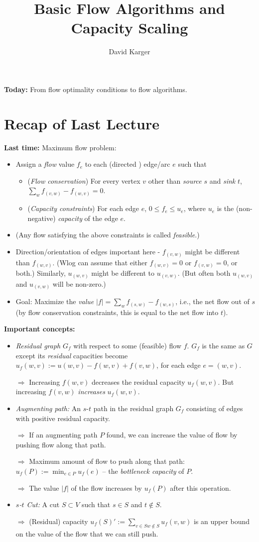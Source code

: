 \documentclass{article}
\title{Basic Flow Algorithms and Capacity Scaling}
\author{David Karger}
\begin{document}
{\bf Today:} From flow optimality conditions to flow algorithms. 

\section{Recap of Last Lecture}

\textbf{Last time:} Maximum flow problem:
\begin{itemize}
\item Assign a \emph{flow} value $f_e$ to each (directed ) edge/arc $e$ such that
\begin{itemize}
\item (\emph{Flow conservation}) For every vertex $v$ other than {\em source} $s$ and {\em sink} $t$, $\sum_w f_{(v,w)}-f_{(w,v)}=0$.
\item (\emph{Capacity constraints}) For each edge $e$, $0\leq f_e \leq u_e$, where $u_e$ is the (non-negative) {\em capacity} of the edge $e$. 
\end{itemize}
\item (Any flow satisfying the above constraints is called {\em feasible}.)
\item {} Direction/orientation of edges important here - $f_{(v, w)}$ might be different than $f_{(w, v)}$.  (Wlog can assume that either $f_{(w, v)}=0$ or $f_{(v, w)}=0$, or both.) Similarly, $u_{(w, v)}$ might be different to $u_{(v, w)}$. (But often both $u_{(w,v)}$ and $u_{(v,w)}$ will be non-zero.)
\item Goal: Maximize the \emph{value} $|f| = \sum_w f_{(s,w)}-f_{(w,s)}$, i.e., the net flow out of $s$ (by flow conservation constraints, this is equal to the net flow into $t$).
\end{itemize}

\textbf{Important concepts:} 

\begin{itemize}
\item {\em Residual graph} $G_f$ with respect to some (feasible) flow $f$. $G_f$ is the same as $G$ except its {\em residual} capacities become $u_f(w,v):= u(w,v) - f(w, v) + f(v, w)$, for each edge $e=(w,v)$.

$\Rightarrow$ Increasing $f(w,v)$ decreases the residual capacity $u_f(w,v)$. But increasing $f(v,w)$ {\em increases} $u_f(w,v)$. 
\item {\em Augmenting path:} An $s$-$t$ path in the residual graph $G_f$ consisting of edges with positive residual capacity.

$\Rightarrow$ If an augmenting path $P$ found, we can increase the value of flow by pushing flow along that path. 

$\Rightarrow$ Maximum amount of flow to push along that path: $u_f(P):=\min_{e\in P} u_f(e)$ -- the {\em bottleneck capacity} of $P$.

$\Rightarrow$ The value $|f|$ of the flow increases by $u_f(P)$ after this operation. 
\item {\em $s$-$t$ Cut:} A cut $S\subset V$ such that $s\in S$ and $t\notin S$.

$\Rightarrow$ (Residual) capacity $u_f(S)':= \sum_{v\in S w\notin S} u_f(v,w)$ is an upper bound on the value of the flow that we can still push.  
\end{itemize}
\end{document}
